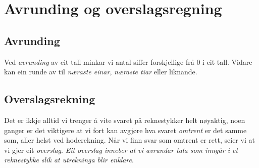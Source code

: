 \section{Avrunding og overslagsregning}

\subsection{Avrunding}
Ved \textit{avrunding} av  eit  tall minkar vi antal siffer forskjellige frå 0 i eit  tall. Vidare kan ein runde av til \textsl{næraste einar}, \textsl{næraste tiar} eller liknande.\regv
{}


\subsection{Overslagsrekning}
Det er ikkje alltid vi trenger å vite svaret på reknestykker helt nøyaktig, noen ganger er det viktigere at vi fort kan avgjøre hva svaret \textsl{omtrent} er det samme som, aller helst ved hoderekning. Når vi finn svar som omtrent er rett, seier vi at vi gjer eit \textit{overslag}. \textsl{Eit overslag inneber at vi avrundar tala som inngår i et reknestykke slik at utrekninga blir enklare}. \vsk

